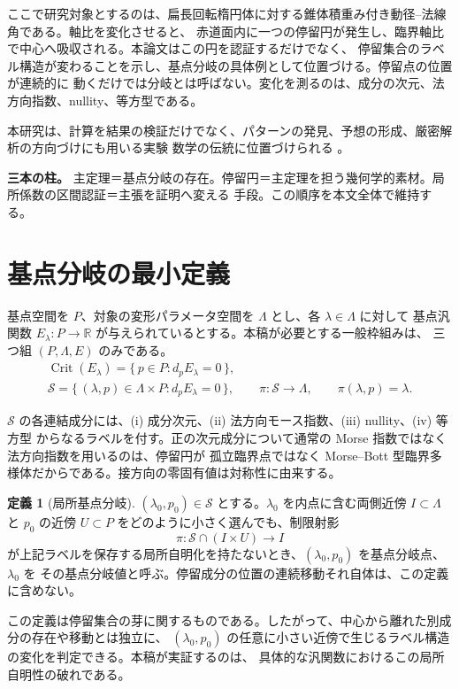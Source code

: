 \documentclass[a4paper,11pt]{ltjsarticle}
\theoremstyle{plain}
\theoremstyle{definition}
\newtheorem{dfn}{定義}[section]
\newcommand{\leadin}[1]{\medskip\noindent\textbf{#1}\quad\ignorespaces}
\begin{document}
ここで研究対象とするのは、扁長回転楕円体に対する錐体積重み付き動径–法線角である。軸比を変化させると、
赤道面内に一つの停留円が発生し、臨界軸比で中心へ吸収される。本論文はこの円を認証するだけでなく、
停留集合のラベル構造が変わることを示し、基点分岐の具体例として位置づける。停留点の位置が連続的に
動くだけでは分岐とは呼ばない。変化を測るのは、成分の次元、法方向指数、nullity、等方型である。

本研究は、計算を結果の検証だけでなく、パターンの発見、予想の形成、厳密解析の方向づけにも用いる実験
数学の伝統に位置づけられる \cite{BorweinBailey}。

\leadin{三本の柱。}
主定理＝基点分岐の存在。停留円＝主定理を担う幾何学的素材。局所係数の区間認証＝主張を証明へ変える
手段。この順序を本文全体で維持する。

\section{基点分岐の最小定義}

基点空間を \(P\)、対象の変形パラメータ空間を \(\Lambda\) とし、各 \(\lambda\in\Lambda\) に対して
基点汎関数 \(E_\lambda:P\to\mathbb{R}\) が与えられているとする。本稿が必要とする一般枠組みは、
三つ組 \((P,\Lambda,E)\) のみである。
\begin{gather}
\operatorname{Crit}(E_\lambda)=\{\,p\in P: d_pE_\lambda=0\,\},\\
\mathcal{S}=\{\,(\lambda,p)\in\Lambda\times P: d_pE_\lambda=0\,\},\qquad
\pi:\mathcal{S}\to\Lambda,\qquad \pi(\lambda,p)=\lambda.
\end{gather}

\(\mathcal{S}\) の各連結成分には、(i) 成分次元、(ii) 法方向モース指数、(iii) nullity、(iv) 等方型
からなるラベルを付す。正の次元成分について通常の Morse 指数ではなく法方向指数を用いるのは、停留円が
孤立臨界点ではなく Morse–Bott 型臨界多様体だからである。接方向の零固有値は対称性に由来する。

\begin{dfn}[局所基点分岐]
\((\lambda_0,p_0)\in\mathcal{S}\) とする。\(\lambda_0\) を内点に含む両側近傍 \(I\subset\Lambda\) と
\(p_0\) の近傍 \(U\subset P\) をどのように小さく選んでも、制限射影
\[
\pi:\mathcal{S}\cap(I\times U)\to I
\]
が上記ラベルを保存する局所自明化を持たないとき、\((\lambda_0,p_0)\) を基点分岐点、\(\lambda_0\) を
その基点分岐値と呼ぶ。停留成分の位置の連続移動それ自体は、この定義に含めない。
\end{dfn}

この定義は停留集合の芽に関するものである。したがって、中心から離れた別成分の存在や移動とは独立に、
\((\lambda_0,p_0)\) の任意に小さい近傍で生じるラベル構造の変化を判定できる。本稿が実証するのは、
具体的な汎関数におけるこの局所自明性の破れである。
\end{document}
